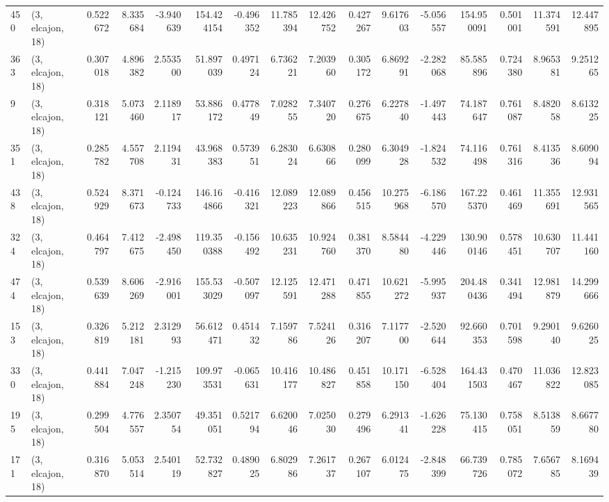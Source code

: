 \begin{tabular}{llrrrrrrrrrrrrrr}
450 &  (3, elcajon, 18) &   0.522672 &   8.335684 &  -3.940639 &   154.424154 &  -0.496352 &  11.785394 &  12.426752 &  0.427267 &   9.617603 &  -5.056557 &   154.950091 &  0.501001 &  11.374591 &  12.447895 \\
363 &  (3, elcajon, 18) &   0.307018 &   4.896382 &   2.553500 &    51.897039 &   0.497124 &   6.736221 &   7.203960 &  0.305172 &   6.869291 &  -2.282068 &    85.585896 &  0.724380 &   8.965381 &   9.251265 \\
9   &  (3, elcajon, 18) &   0.318121 &   5.073460 &   2.118917 &    53.886172 &   0.477849 &   7.028255 &   7.340720 &  0.276675 &   6.227840 &  -1.497443 &    74.187647 &  0.761087 &   8.482058 &   8.613225 \\
351 &  (3, elcajon, 18) &   0.285782 &   4.557708 &   2.119431 &    43.968383 &   0.573951 &   6.283024 &   6.630866 &  0.280099 &   6.304928 &  -1.824532 &    74.116498 &  0.761316 &   8.413536 &   8.609094 \\
438 &  (3, elcajon, 18) &   0.524929 &   8.371673 &  -0.124733 &   146.164866 &  -0.416321 &  12.089223 &  12.089866 &  0.456515 &  10.275968 &  -6.186570 &   167.225370 &  0.461469 &  11.355691 &  12.931565 \\
324 &  (3, elcajon, 18) &   0.464797 &   7.412675 &  -2.498450 &   119.350388 &  -0.156492 &  10.635231 &  10.924760 &  0.381370 &   8.584480 &  -4.229446 &   130.900146 &  0.578451 &  10.630707 &  11.441160 \\
474 &  (3, elcajon, 18) &   0.539639 &   8.606269 &  -2.916001 &   155.533029 &  -0.507097 &  12.125591 &  12.471288 &  0.471855 &  10.621272 &  -5.995937 &   204.480436 &  0.341494 &  12.981879 &  14.299666 \\
153 &  (3, elcajon, 18) &   0.326819 &   5.212181 &   2.312993 &    56.612471 &   0.451432 &   7.159786 &   7.524126 &  0.316207 &   7.117700 &  -2.520644 &    92.660353 &  0.701598 &   9.290140 &   9.626025 \\
330 &  (3, elcajon, 18) &   0.441884 &   7.047248 &  -1.215230 &   109.973531 &  -0.065631 &  10.416177 &  10.486827 &  0.451858 &  10.171150 &  -6.528404 &   164.431503 &  0.470467 &  11.036822 &  12.823085 \\
195 &  (3, elcajon, 18) &   0.299504 &   4.776557 &   2.350754 &    49.351051 &   0.521794 &   6.620046 &   7.025030 &  0.279496 &   6.291341 &  -1.626228 &    75.130415 &  0.758051 &   8.513859 &   8.667780 \\
171 &  (3, elcajon, 18) &   0.316870 &   5.053514 &   2.540119 &    52.732827 &   0.489025 &   6.802986 &   7.261737 &  0.267107 &   6.012475 &  -2.848399 &    66.739726 &  0.785072 &   7.656785 &   8.169439 \\

\end{tabular}
